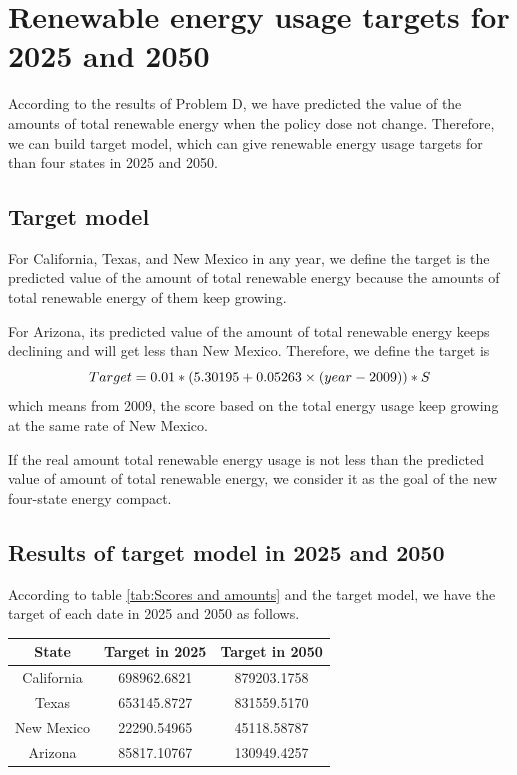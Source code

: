\documentclass[a4paper,11pt]{article}
\begin{document}
\section{Renewable energy usage targets for 2025 and 2050}
\par According to the results of Problem D, we have predicted the value of the amounts of total renewable energy when the policy dose not change. Therefore, we can build target model, which can give renewable energy usage targets for than four states in 2025 and 2050.
\subsection{Target model}
\par For California, Texas, and New Mexico in any year, we define the target is the predicted value of the amount of total renewable energy because the amounts of total renewable energy of them keep growing.
\par For Arizona, its predicted value of the amount of total renewable energy keeps declining and will get less than New Mexico. Therefore, we define the target is
\begin{equation}
    \centering
    Target=0.01*(5.30195+0.05263 \times (year-2009))*S
\end{equation}
which means from 2009, the score based on the total energy usage keep growing at the same rate of New Mexico.
\par If the real amount total renewable energy usage is not less than the predicted value of amount of total renewable energy, we consider it as the goal of the new four-state energy compact.
\subsection{Results of target model in 2025 and 2050}
\par According to table \ref{tab:Scores and amounts} and the target model, we have the target of each date in 2025 and 2050 as follows.
\begin{table}[!hbp]
    \centering 
    \begin{tabular}{|c|c|c|}
\hline
State & Target in 2025 & Target in 2050\\
\hline
California & 698962.6821 & 879203.1758 \\
\hline
Texas & 653145.8727 & 831559.5170 \\
\hline
New Mexico & 22290.54965 & 45118.58787 \\
\hline
Arizona & 85817.10767 & 130949.4257 \\
\hline
\end{tabular}
\end{table}
\end{document}
